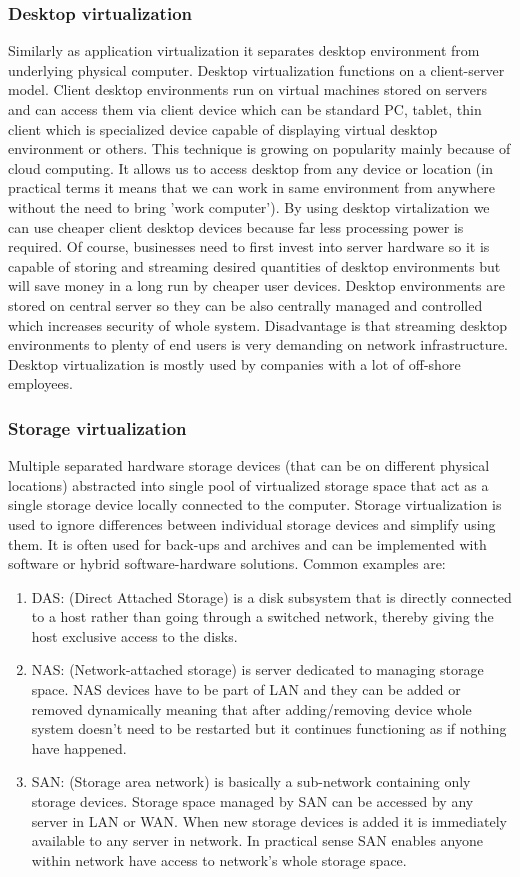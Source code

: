 \subsubsection{Desktop virtualization}
Similarly as application virtualization it separates desktop environment from underlying physical computer. Desktop virtualization functions on a client-server model. Client desktop environments run on virtual machines stored on servers and can access them via client device which can be standard PC, tablet, thin client which is specialized device capable of displaying virtual desktop environment or others. This technique is growing on popularity mainly because of cloud computing. It allows us to access desktop from any device or location (in practical terms it means that we can work in same environment from anywhere without the need to bring 'work computer'). By using desktop virtalization we can use cheaper client desktop devices because far less processing power is required. Of course, businesses need to first invest into server hardware so it is capable of storing and streaming desired quantities of desktop environments but will save money in a long run by cheaper user devices. Desktop environments are stored on central server so they can be also centrally managed and controlled which increases security of whole system. Disadvantage is that streaming desktop environments to plenty of end users is very demanding on network infrastructure. Desktop virtualization is mostly used by companies with a lot of off-shore employees.

\subsubsection{Storage virtualization}
Multiple separated hardware storage devices (that can be on different physical locations) abstracted into single pool of virtualized storage space that act as a single storage device locally connected to the computer. Storage virtualization is used to ignore differences between individual storage devices and simplify using them. It is often used for back-ups and archives and can be implemented with software or hybrid software-hardware solutions. Common examples are:
\begin{enumerate}
\item DAS: (Direct Attached Storage) is a disk subsystem that is directly connected to a host rather than going through a switched network, thereby giving the host exclusive access to the disks.
\item NAS: (Network-attached storage) is server dedicated to managing storage space. NAS devices have to be part of LAN and they can be added or removed dynamically meaning that after adding/removing device whole system doesn't need to be restarted but it continues functioning as if nothing have happened.
\item SAN: (Storage area network) is basically a sub-network containing only storage devices. Storage space managed by SAN can be accessed by any server in LAN or WAN. When new storage devices is added it is immediately available to any server in network. In practical sense SAN enables anyone within network have access to network's whole storage space.
\end{enumerate}


